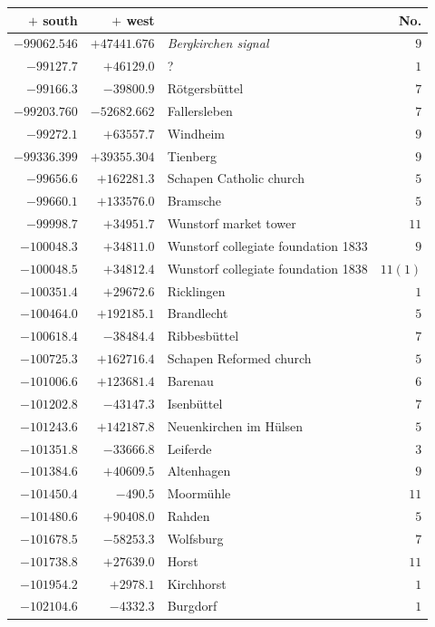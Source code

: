 \clearpage{}%
\begin{center}\begingroup\fontsize{8}{9}\selectfont
\setlength{\tabcolsep}{4pt}
\begin{tabular}{r|r|p{170pt}|r}\hline
\(+\) south&\(+\) west&&No.\\\hline
\(-99062.546\)&\(+47441.676\)&\textit{Bergkirchen signal}&\(9\)\\
\(-99127.7\)&\(+46129.0\)&?&\(1\)\\
\(-99166.3\)&\(-39800.9\)&Rötgersbüttel&\(7\)\\
\(-99203.760\)&\(-52682.662\)&Fallersleben&\(7\)\\
\(-99272.1\)&\(+63557.7\)&Windheim&\(9\)\\
\(-99336.399\)&\(+39355.304\)&Tienberg&\(9\)\\
\(-99656.6\)&\(+162281.3\)&Schapen Catholic church&\(5\)\\
\(-99660.1\)&\(+133576.0\)&Bramsche&\(5\)\\
\(-99998.7\)&\(+34951.7\)&Wunstorf market tower&\(11\)\\
\(-100048.3\)&\(+34811.0\)&Wunstorf collegiate foundation 1833&\(9\)\\
\(-100048.5\)&\(+34812.4\)&Wunstorf collegiate foundation 1838&\(11 (1)\)\\
\(-100351.4\)&\(+29672.6\)&Ricklingen&\(1\)\\
\(-100464.0\)&\(+192185.1\)&Brandlecht&\(5\)\\
\(-100618.4\)&\(-38484.4\)&Ribbesbüttel&\(7\)\\
\(-100725.3\)&\(+162716.4\)&Schapen Reformed church&\(5\)\\
\(-101006.6\)&\(+123681.4\)&Barenau&\(6\)\\
\(-101202.8\)&\(-43147.3\)&Isenbüttel&\(7\)\\
\(-101243.6\)&\(+142187.8\)&Neuenkirchen im Hülsen&\(5\)\\
\(-101351.8\)&\(-33666.8\)&Leiferde&\(3\)\\
\(-101384.6\)&\(+40609.5\)&Altenhagen&\(9\)\\
\(-101450.4\)&\(-490.5\)&Moormühle&\(11\)\\
\(-101480.6\)&\(+90408.0\)&Rahden&\(5\)\\
\(-101678.5\)&\(-58253.3\)&Wolfsburg&\(7\)\\
\(-101738.8\)&\(+27639.0\)&Horst&\(11\)\\
\(-101954.2\)&\(+2978.1\)&Kirchhorst&\(1\)\\
\(-102104.6\)&\(-4332.3\)&Burgdorf&\(1\)\\

\end{tabular}
\end{center}
